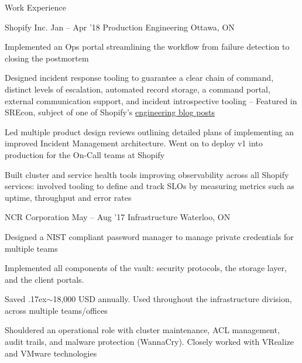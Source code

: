 \documentclass{resume} %
\begin{document}
\begin{rSection}{Work Experience}
  \begin{rSubsection}{Shopify Inc.}
		     {Jan -- Apr '18}
		     {Production Engineering}
		     {Ottawa, ON}
    \item Implemented an Ops portal streamlining the workflow from
      failure detection to closing the postmortem
    \item Designed incident response tooling to guarantee a clear chain of command,
      distinct levels of escalation, automated record storage, a command portal,
      external communication support, and
      incident introspective tooling -- Featured in SREcon, subject of one of Shopify's 
      \href{https://engineering.shopify.com/blogs/engineering/implementing-chatops-into-our-incident-management-procedure}
      {\underline{engineering blog posts}}
    \item Led multiple product design reviews outlining detailed plans of
      implementing an improved Incident Management architecture. Went on
      to deploy v1 into production for the On-Call teams at Shopify
    \item Built cluster and service health tools improving observability
      across all Shopify services: involved tooling to define and
      track SLOs by measuring metrics such as uptime, throughput and error rates
  \end{rSubsection}

  \begin{rSubsection}{NCR Corporation}
		     {May -- Aug '17}
		     {Infrastructure}
		     {Waterloo, ON}
    \item Designed a NIST compliant password manager to manage private
      credentials for multiple teams
    \item Implemented all components of the vault: security
      protocols, the storage layer, and the client portals.
    \item Saved {\raise.17ex\hbox{$\scriptstyle\mathtt{\sim}$}}18,000 USD
      annually. Used throughout the infrastructure division, across multiple
      teams/offices
    \item Shouldered an operational role with cluster maintenance, ACL management,
      audit trails, and malware protection (WannaCry). Closely worked with
      VRealize and VMware technologies
  \end{rSubsection}
\end{rSection} 
\end{document}
